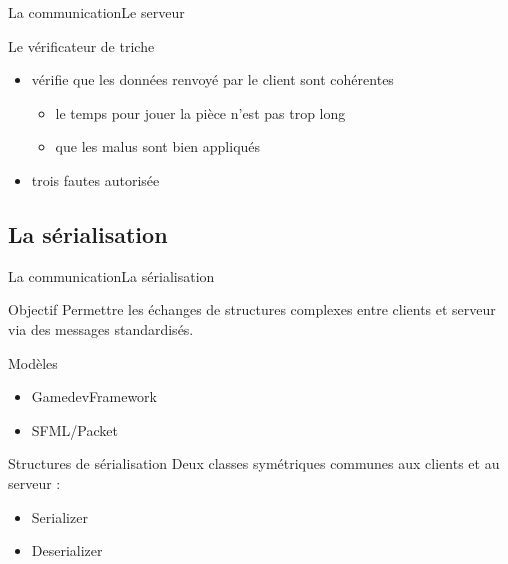 \documentclass[french]{beamer}
\begin{document}
	\begin{frame}{La communication}{Le serveur}
		\begin{block}{Le vérificateur de triche}
			\begin{itemize}
				\item vérifie que les données renvoyé par le client sont cohérentes
				\begin{itemize}
					\item le temps pour jouer la pièce n'est pas trop long
					\item que les malus sont bien appliqués
				\end{itemize}
				\item trois fautes autorisée
			\end{itemize}
		\end{block}


	\end{frame}
























\subsection{La sérialisation}

		\begin{frame}{La communication}{La sérialisation}
	        \begin{block}{Objectif}
	            Permettre les échanges de structures complexes entre clients et serveur via des messages standardisés.
	        \end{block}

	        \begin{block}{Modèles}
	            \begin{itemize}
	                \item GamedevFramework
	                \item SFML/Packet
	            \end{itemize}
	        \end{block}

	        \begin{block}{Structures de sérialisation}
	            Deux classes symétriques communes aux clients et au serveur : 
	            \begin{itemize}
	                \item Serializer
	                \item Deserializer
	            \end{itemize}
	        \end{block}     

	    \end{frame}
\end{document}
